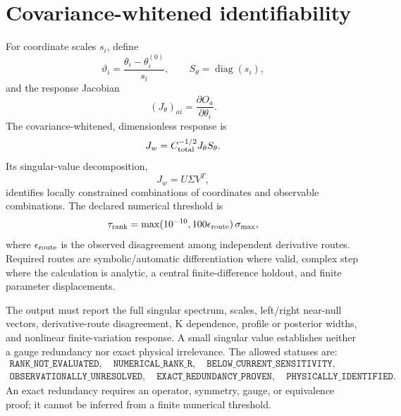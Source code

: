 \documentclass[11pt,oneside]{book}
\newcommand{\diag}{\operatorname{diag}}
\begin{document}
\section{Covariance-whitened identifiability}

For coordinate scales $s_i$, define
\begin{equation}
 \vartheta_i=\frac{\theta_i-\theta_i^{(0)}}{s_i},
 \qquad
 S_\theta=\diag(s_i),
\end{equation}
and the response Jacobian
\begin{equation}
 (J_\theta)_{ai}=\frac{\partial O_a}{\partial\theta_i}.
\end{equation}
The covariance-whitened, dimensionless response is
\begin{equation}
 J_w=C_{\rm total}^{-1/2}J_\theta S_\theta.
 \label{eq:whitened-jacobian}
\end{equation}
Its singular-value decomposition,
\begin{equation}
 J_w=U\Sigma V^T,
 \label{eq:svd}
\end{equation}
identifies locally constrained combinations of coordinates and observable combinations.  The declared numerical threshold is
\begin{equation}
 \tau_{\rm rank}
 =\max(10^{-10},100\epsilon_{\rm route})\,\sigma_{\max},
 \label{eq:rank-threshold}
\end{equation}
where $\epsilon_{\rm route}$ is the observed disagreement among independent derivative routes.  Required routes are symbolic/automatic differentiation where valid, complex step where the calculation is analytic, a central finite-difference holdout, and finite parameter displacements.

The output must report the full singular spectrum, scales, left/right near-null vectors, derivative-route disagreement, K dependence, profile or posterior widths, and nonlinear finite-variation response.  A small singular value establishes neither a gauge redundancy nor exact physical irrelevance.  The allowed statuses are:
\begin{equation}
 \begin{gathered}
 \texttt{RANK\_NOT\_EVALUATED},\quad
 \texttt{NUMERICAL\_RANK\_R},\quad
 \texttt{BELOW\_CURRENT\_SENSITIVITY},\\
 \texttt{OBSERVATIONALLY\_UNRESOLVED},\quad
 \texttt{EXACT\_REDUNDANCY\_PROVEN},\quad
 \texttt{PHYSICALLY\_IDENTIFIED}.
 \end{gathered}
 \label{eq:rank-statuses}
\end{equation}
An exact redundancy requires an operator, symmetry, gauge, or equivalence proof; it cannot be inferred from a finite numerical threshold.
\end{document}
